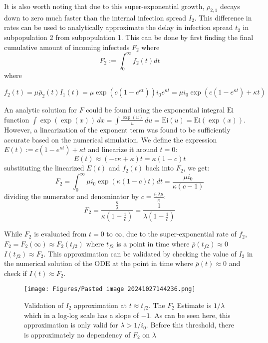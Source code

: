 It is also worth noting that due to this super-exponential growth, $\rho_{2,1}$ decays down to zero much faster than the internal infection spread $I_2$. This difference in rates can be used to analytically approximate the delay in infection spread $t_2$ in subpopulation 2 from subpopulation 1. This can be done by first finding the final cumulative amount of incoming infecteds $F_2$ where 
$$F_2:=\int_0^\infty f_2(t)dt$$
where 

$$f_2(t)=\mu \bar \rho_2(t) I_1(t) = \mu \exp\left({c \left( 1 - e^{\kappa t} \right)}\right)i_0 e^{\kappa t} = \mu i_0 \exp\left({c \left( 1 - e^{\kappa t} \right)} +\kappa t\right)$$

An analytic solution for $F$ could be found using the exponential integral $\mathrm{Ei}$ function  $\int\exp(\exp(x))\,d x=\int{\frac{\exp(u)}{u}}\,d u={\mathrm{Ei}}(u)={\mathrm{Ei}}(\exp(x))$. However, a linearization of the exponent term was found to be sufficiently accurate based on the numerical simulation. We define the expression $E(t):=c\left( 1 - e^{\kappa t} \right)+\kappa t$ and linearize it around $t=0$: 
$$E(t)\approx (-c\kappa+\kappa)t = \kappa (1-c) t$$
substituting the linearized $E(t)$ and $f_2(t)$ back into $F_2$, we get:
$$F_2=\int_0^\infty \mu i_0 \exp\left(\kappa (1-c) t \right) dt = \frac{\mu i_0}{\kappa(c-1)}$$
dividing the numerator and denominator by $c=\frac{i_{0} \lambda \mu}{\kappa}$:
\begin{equation}
F_2=\frac{\frac{\kappa}{\lambda}}{\kappa\left( 1-\frac{1}{c} \right)}=\frac{1}{\lambda\left( 1-\frac{1}{c} \right)}
\end{equation}

While $F_2$ is evaluated from $t=0$ to $\infty$, due to the super-exponential rate of $f_2$, $F_2=F_2(\infty)\approx F_2(t_{f2})$ where $t_{f2}$ is a point in time where $\bar\rho(t_{f2})\approx 0$  $I({t_{f2}})\approx F_2$. This approximation can be validated by checking the value of $I_2$ in the numerical solution of the ODE at the point in time where $\bar\rho(t)\approx 0$ and check if $I(t)\approx F_2$. 

\begin{figure}[!ht]
    \centering
    \texttt{[image: Figures/Pasted image 20241027144236.png]}
    \caption{\small Validation of $I_2$ approximation at $t \approx t_{f2}$. The $F_2$ Estimate is $1/\lambda$ which in a log-log scale has a slope of $-1$. As can be seen here, this approximation is only valid for $\lambda>1/i_0$. Before this threshold, there is approximately no dependency of $F_2$ on $\lambda$ }

\end{figure}

